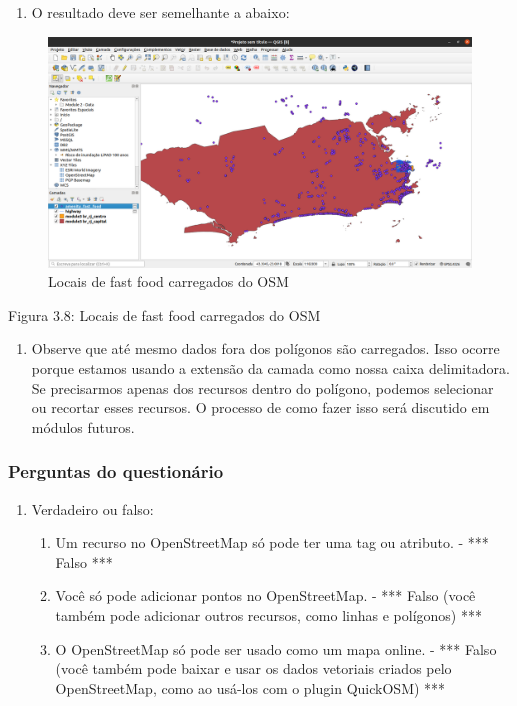 \documentclass[
]{book}
\providecommand{\tightlist}{%
  \setlength{\itemsep}{0pt}\setlength{\parskip}{0pt}}
\begin{document}
\begin{enumerate}
\def\labelenumi{\arabic{enumi}.}
\setcounter{enumi}{8}
\tightlist
\item
  O resultado deve ser semelhante a abaixo:
\end{enumerate}

\begin{figure}
\centering
\includegraphics{media/modulo3/quickosm-7.png}
\caption{Locais de fast food carregados do OSM}
\end{figure}

Figura 3.8: Locais de fast food carregados do OSM

\begin{enumerate}
\def\labelenumi{\arabic{enumi}.}
\setcounter{enumi}{9}
\tightlist
\item
  Observe que até mesmo dados fora dos polígonos são carregados. Isso ocorre porque estamos usando a extensão da camada como nossa caixa delimitadora. Se precisarmos apenas dos recursos dentro do polígono, podemos selecionar ou recortar esses recursos. O processo de como fazer isso será discutido em módulos futuros.
\end{enumerate}

\hypertarget{perguntas-do-questionuxe1rio-8}{%
\subsubsection{\texorpdfstring{\textbf{Perguntas do questionário}}{Perguntas do questionário}}\label{perguntas-do-questionuxe1rio-8}}

\begin{enumerate}
\def\labelenumi{\arabic{enumi}.}
\item
  Verdadeiro ou falso:

  \begin{enumerate}
  \def\labelenumii{\arabic{enumii}.}
  \tightlist
  \item
    Um recurso no OpenStreetMap só pode ter uma tag ou atributo. - *** Falso ***
  \item
    Você só pode adicionar pontos no OpenStreetMap. - *** Falso (você também pode adicionar outros recursos, como linhas e polígonos) ***
  \item
    O OpenStreetMap só pode ser usado como um mapa online. - *** Falso (você também pode baixar e usar os dados vetoriais criados pelo OpenStreetMap, como ao usá-los com o plugin QuickOSM) ***
  \end{enumerate}
\end{enumerate}
\end{document}
